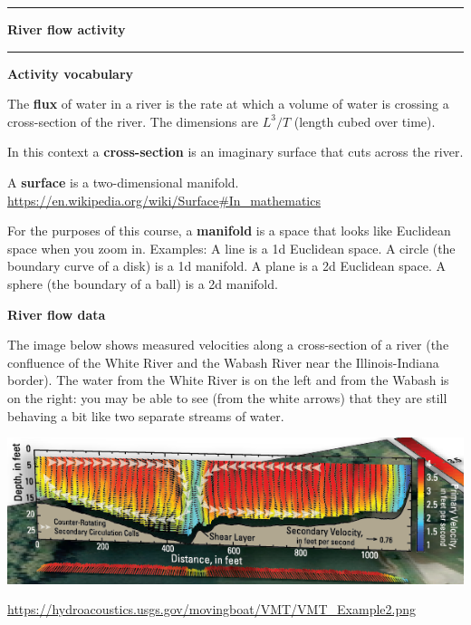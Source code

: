 \documentclass[12pt,letterpaper,noanswers]{exam}
\begin{document}
\vspace{0.2cm}

\hrule
\vspace{0.2cm}

\noindent\textbf{River flow activity}


\vspace{0.2cm}
\hrule
\vspace{0.2cm}


\noindent\textbf{Activity vocabulary}
\begin{tcolorbox}
The \textbf{flux} of water in a river is the rate at which a volume of water is crossing a cross-section of the river.  The dimensions are $L^3/T$ (length cubed over time).

In this context a \textbf{cross-section} is an imaginary surface that cuts across the river.  

A \textbf{surface} is a two-dimensional manifold. \url{https://en.wikipedia.org/wiki/Surface#In_mathematics}

For the purposes of this course, a \textbf{manifold} is a space that looks like Euclidean space when you zoom in.  Examples: A line is a 1d Euclidean space.  A circle (the boundary curve of a disk) is a 1d manifold.  A plane is a 2d Euclidean space.  A sphere (the boundary of a ball) is a 2d manifold.

\end{tcolorbox}

\noindent\textbf{River flow data}

The image below shows measured velocities along a cross-section of a river (the confluence of the White River and the Wabash River near the Illinois-Indiana border).  The water from the White River is on the left and from the Wabash is on the right: you may be able to see (from the white arrows) that they are still behaving a bit like two separate streams of water.

\includegraphics[width=\textwidth]{img/C01adcpUSGS-2.png}

\url{https://hydroacoustics.usgs.gov/movingboat/VMT/VMT_Example2.png}
\end{document}
